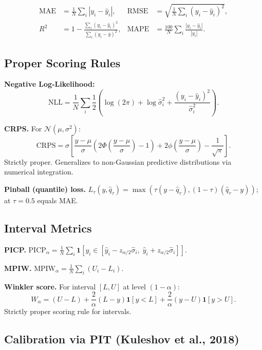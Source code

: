 \documentclass[11pt,a4paper]{article}
\theoremstyle{definition}
\begin{document}
\begin{align}
  \text{MAE} &= \frac{1}{N}\sum_{i} |y_i - \hat{y}_i|, &
  \text{RMSE} &= \sqrt{\frac{1}{N}\sum_{i} (y_i - \hat{y}_i)^2}, \\
  R^2 &= 1 - \frac{\sum_i (y_i - \hat{y}_i)^2}{\sum_i (y_i - \bar{y})^2}, &
  \text{MAPE} &= \frac{100}{N}\sum_{i} \frac{|y_i - \hat{y}_i|}{|y_i|}.
\end{align}

\subsection{Proper Scoring Rules}

\textbf{Negative Log-Likelihood:}
\[
  \text{NLL} = \frac{1}{N}\sum_{i} \frac{1}{2}\left(\log(2\pi) + \log\hat{\sigma}_i^2 + \frac{(y_i - \hat{y}_i)^2}{\hat{\sigma}_i^2}\right).
\]

\textbf{CRPS.} For $\mathcal{N}(\mu, \sigma^2)$:
\begin{equation}
  \text{CRPS} = \sigma \left[
    \frac{y - \mu}{\sigma}\left(2\Phi\!\left(\frac{y-\mu}{\sigma}\right) - 1\right) +
    2\phi\!\left(\frac{y-\mu}{\sigma}\right) - \frac{1}{\sqrt{\pi}}
  \right].
  \label{eq:crps}
\end{equation}
Strictly proper. Generalizes to non-Gaussian predictive distributions via
numerical integration.

\textbf{Pinball (quantile) loss.}
$L_\tau(y, \hat{q}_\tau) = \max(\tau(y - \hat{q}_\tau), (1-\tau)(\hat{q}_\tau - y))$;
at $\tau = 0.5$ equals MAE.

\subsection{Interval Metrics}

\textbf{PICP.}
$\text{PICP}_\alpha = \frac{1}{N}\sum_{i} \mathbf{1}[y_i \in [\hat{y}_i - z_{\alpha/2}\hat{\sigma}_i,\; \hat{y}_i + z_{\alpha/2}\hat{\sigma}_i]]$.

\textbf{MPIW.}
$\text{MPIW}_\alpha = \frac{1}{N}\sum_{i}(U_i - L_i)$.

\textbf{Winkler score.} For interval $[L, U]$ at level $(1-\alpha)$:
\begin{equation}
  W_\alpha = (U - L) +
  \frac{2}{\alpha}(L - y)\mathbf{1}[y < L] +
  \frac{2}{\alpha}(y - U)\mathbf{1}[y > U].
  \label{eq:winkler}
\end{equation}
Strictly proper scoring rule for intervals.

\subsection{Calibration via PIT (Kuleshov et al., 2018)}
\label{sec:pit_cal}
\end{document}
